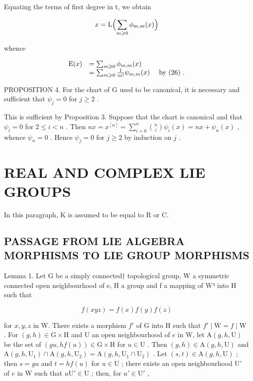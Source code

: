Equating the terms of first degree in t, we obtain

\[
x = \mathrm{L} \Bigl (\sum_ {m \geqslant 0} \phi_ {m, m} (x) \Bigr)
\]

whence

\[
\begin{array}{r l} \mathrm{E} (x) & = \sum_ {m \geqslant 0} \phi_ {m, m} (x) \\ & = \sum_ {m \geqslant 0} \frac {1}{m !} \psi_ {m, m} (x) \quad \text { by   (26) }. \end{array}
\]

PROPOSITION 4. For the chart of G used to be canonical, it is necessary and sufficient that \(\psi_j = 0\) for \(j \geqslant 2\) .

This is sufficient by Proposition 3. Suppose that the chart is canonical and that \(\psi_{i} = 0\) for \(2 \leqslant i < n\) . Then \(nx = x^{[n]} = \sum_{i=0}^{n} \binom{n}{i} \psi_{i}(x) = nx + \psi_{n}(x)\) , whence \(\psi_{n} = 0\) . Hence \(\psi_{j} = 0\) for \(j \geqslant 2\) by induction on \(j\) .

\section{REAL AND COMPLEX LIE GROUPS}

In this paragraph, K is assumed to be equal to R or C.

\subsection{PASSAGE FROM LIE ALGEBRA MORPHISMS TO LIE GROUP MORPHISMS}

Lemma 1. Let G be a simply connected† topological group, W a symmetric connected open neighbourhood of e, H a group and f a mapping of W³ into H such that

\[
f (x y z) = f (x) f (y) f (z)
\]

for \(x, y, z\) in W. There exists a morphism \(f'\) of G into H such that \(f' \mid \mathrm{W} = f \mid \mathrm{W}\) . For \((g, h) \in \mathrm{G} \times \mathrm{H}\) and U an open neighbourhood of \(e\) in W, let \(\mathrm{A}(g, h, \mathrm{U})\) be the set of \((gu, hf(u)) \in \mathrm{G} \times \mathrm{H}\) for \(u \in \mathrm{U}\) . Then \((g, h) \in \mathrm{A}(g, h, \mathrm{U})\) and \(\mathrm{A}(g, h, \mathrm{U}_1) \cap \mathrm{A}(g, h, \mathrm{U}_2) = \mathrm{A}(g, h, \mathrm{U}_1 \cap \mathrm{U}_2)\) . Let \((s, t) \in \mathrm{A}(g, h, \mathrm{U})\) ; then \(s = gu\) and \(t = hf(u)\) for \(u \in \mathrm{U}\) ; there exists an open neighbourhood \(\mathrm{U}'\) of \(e\) in W such that \(u\mathrm{U}' \in \mathrm{U}\) ; then, for \(u' \in \mathrm{U}'\) ,


